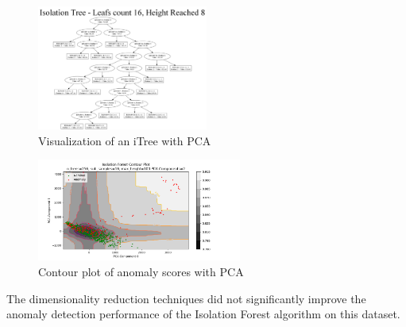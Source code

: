 \begin{figure}[htbp]
\centering
\includegraphics[width=0.5\textwidth]{resources/images/itree_pca_graph.png}
\caption{Visualization of an iTree with PCA}
\label{fig:pca_itree}
\end{figure}

\begin{figure}[htbp]
\centering
\includegraphics[width=0.6\textwidth]{resources/images/pca_contour_plot.png}
\caption{Contour plot of anomaly scores with PCA}
\label{fig:pca_contour}
\end{figure}

The dimensionality reduction techniques did not significantly improve the anomaly detection performance of the Isolation Forest algorithm on this dataset.
